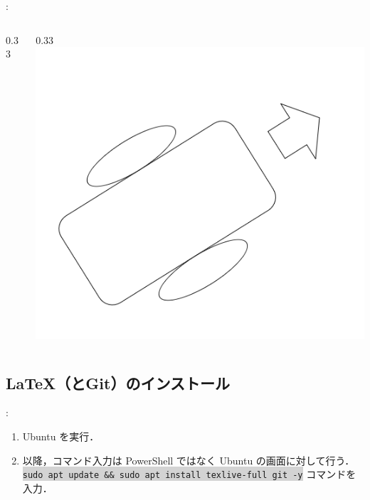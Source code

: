 \documentclass[aspectratio=169,dvipdfmx,cjk]{beamer}
\newcommand{\cmdline}[1]{
    \colorbox{lightgray}{\lstinline[style=command]{#1}}
}
\begin{document}
\begin{frame}{\insertsection \thesubsection: \insertsubsection}
\begin{columns}
\begin{column}{0.33\textwidth}
    \end{column}
    \begin{column}{0.33\textwidth}
      \includegraphics[width=1.0\linewidth]{fig/robot.png}
    \end{column}
  \end{columns}
\end{frame}

\subsection{\LaTeX （とGit）のインストール}
\begin{frame}{\insertsection \thesubsection: \insertsubsection}
  \begin{enumerate}
    \item Ubuntu を実行．
    \item 以降，コマンド入力は PowerShell ではなく Ubuntu の画面に対して行う．\\ \cmdline{sudo apt update && sudo apt install texlive-full git -y} コマンドを入力．
  \end{enumerate}
\end{frame}
\end{document}
